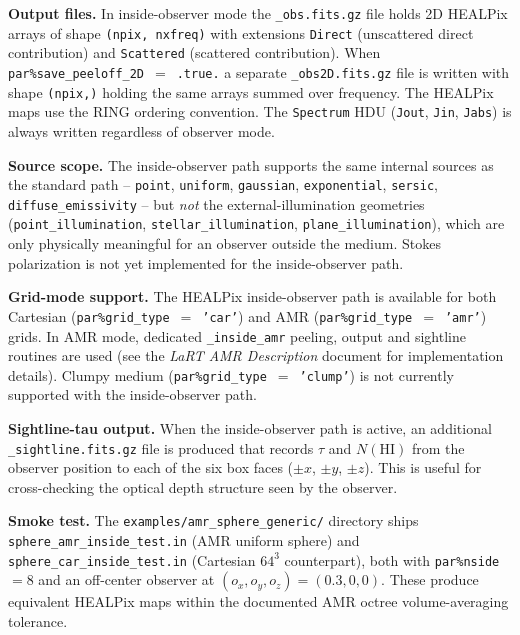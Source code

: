 \documentclass[english,a4paper]{my_memo}
\newcommand{\parm}[1]{\texttt{par\%#1}}
\begin{document}
\begin{sloppypar}
\textbf{Output files.}  In inside-observer mode the
\texttt{\_obs.fits.gz} file holds 2D HEALPix arrays of shape
\texttt{(npix, nxfreq)} with extensions
\texttt{Direct} (unscattered direct contribution) and
\texttt{Scattered} (scattered contribution).  When
\parm{save\_peeloff\_2D}~$=$~\texttt{.true.} a separate
\texttt{\_obs2D.fits.gz} file is written with shape \texttt{(npix,)}
holding the same arrays summed over frequency.  The HEALPix maps use
the RING ordering convention.  The \texttt{Spectrum} HDU
(\texttt{Jout}, \texttt{Jin}, \texttt{Jabs}) is always written
regardless of observer mode.
\end{sloppypar}

\begin{sloppypar}
\textbf{Source scope.}  The inside-observer path supports the same
internal sources as the standard path -- \texttt{point},
\texttt{uniform}, \texttt{gaussian}, \texttt{exponential},
\texttt{sersic}, \texttt{diffuse\_emissivity} -- but \emph{not} the
external-illumination geometries (\texttt{point\_illumination},
\texttt{stellar\_illumination}, \texttt{plane\_illumination}), which
are only physically meaningful for an observer outside the medium.
Stokes polarization is not yet implemented for the inside-observer
path.
\end{sloppypar}

\begin{sloppypar}
\textbf{Grid-mode support.}  The HEALPix inside-observer path is
available for both Cartesian (\parm{grid\_type}~$=$~\texttt{'car'}) and
AMR (\parm{grid\_type}~$=$~\texttt{'amr'}) grids.  In AMR mode,
dedicated \texttt{\_inside\_amr} peeling, output and sightline
routines are used (see the \emph{LaRT AMR Description} document for
implementation details).  Clumpy medium
(\parm{grid\_type}~$=$~\texttt{'clump'}) is not currently supported
with the inside-observer path.
\end{sloppypar}

\textbf{Sightline-tau output.}  When the inside-observer path is
active, an additional \texttt{\_sightline.fits.gz} file is produced
that records $\tau$ and $N(\mathrm{HI})$ from the observer position
to each of the six box faces ($\pm x$, $\pm y$, $\pm z$).  This is
useful for cross-checking the optical depth structure seen by the
observer.

\begin{sloppypar}
\textbf{Smoke test.}  The
\texttt{examples/amr\_sphere\_generic/} directory ships
\texttt{sphere\_amr\_inside\_test.in} (AMR uniform sphere) and
\texttt{sphere\_car\_inside\_test.in} (Cartesian $64^3$ counterpart),
both with \parm{nside}~$= 8$ and an off-center observer at
$(o_x, o_y, o_z) = (0.3, 0, 0)$.  These produce equivalent HEALPix
maps within the documented AMR octree volume-averaging tolerance.
\end{sloppypar}
\end{document}
